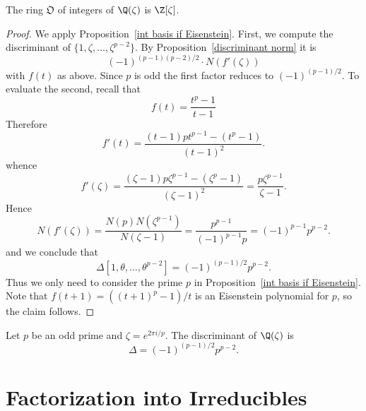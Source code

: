 \begin{theorem}
The ring $\mathfrak{O}$ of integers of $\Q(\zeta)$ is $\Z[\zeta]$.
\end{theorem}
\begin{proof}
We apply Proposition~\ref{int basis if Eisenstein}. First, we compute the discriminant of $\{1,\zeta,\dots,\zeta^{p-2}\}$. By Proposition~\ref{discriminant norm} it is
\[(-1)^{(p-1)(p-2)/2}\cdot N(f'(\zeta))\]
with $f(t)$ as above. Since $p$ is odd the first factor reduces to $(-1)^{(p-1)/2}$. To evaluate the second, recall that
\[f(t)=\frac{t^p-1}{t-1}\]
Therefore
\[f'(t)=\frac{(t-1)pt^{p-1}-(t^p-1)}{(t-1)^2}.\]
whence
\[f'(\zeta)=\frac{(\zeta-1)p\zeta^{p-1}-(\zeta^p-1)}{(\zeta-1)^2}=\frac{p\zeta^{p-1}}{\zeta-1}.\]
Hence
\[N(f'(\zeta))=\frac{N(p)N(\zeta^{p-1})}{N(\zeta-1)}=\frac{p^{p-1}}{(-1)^{p-1}p}=(-1)^{p-1}p^{p-2}.\]
and we conclude that
\[\Delta[1,\theta,\dots,\theta^{p-2}]=(-1)^{(p-1)/2}p^{p-2}.\]
Thus we only need to consider the prime $p$ in Proposition~\ref{int basis if Eisenstein}. Note that $f(t+1)=((t+1)^p-1)/t$ is an Eisenstein polynomial for $p$, so the claim follows.
\end{proof}
\begin{corollary}\label{cyclotomic disc}
Let $p$ be an odd prime and $\zeta=e^{2\pi i/p}$. The discriminant of $\Q(\zeta)$ is
\[\Delta=(-1)^{(p-1)/2}p^{p-2}.\]
\end{corollary}
\section{Factorization into Irreducibles}
